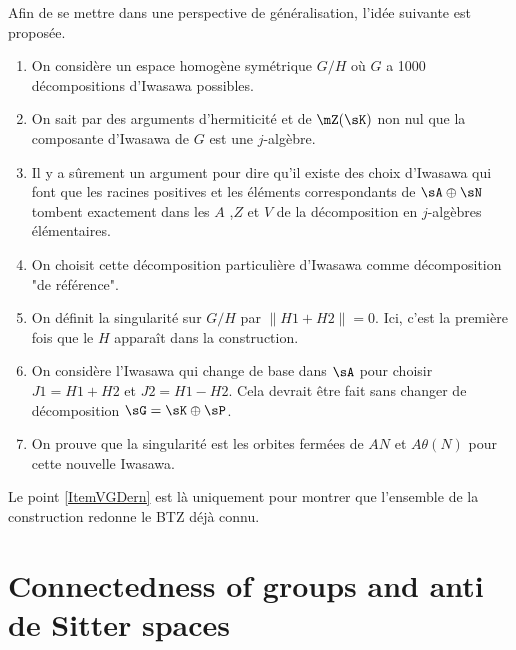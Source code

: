 Afin de se mettre dans une perspective de généralisation, l'idée suivante est proposée.

\begin{enumerate}

	\item
		


On considère un espace homogène symétrique $G/H$ où $G$ a 1000 décompositions d'Iwasawa possibles.

\item
 On sait par des arguments d'hermiticité et de $\mZ(\sK)$ non nul que la composante d'Iwasawa de $G$ est une $j$-algèbre.

\item
Il y a sûrement un argument pour dire qu'il existe des choix d'Iwasawa qui font que les racines positives et les éléments correspondants de $\sA\oplus\sN$ tombent exactement dans les $A$ ,$Z$ et $V $ de la décomposition en $j$-algèbres élémentaires.

\item
On choisit cette décomposition particulière d'Iwasawa comme décomposition "de référence".

\item
 On définit la singularité sur $G/H$ par $\| H1+H2\|=0$. Ici, c'est la première fois que le $H$ apparaît dans la construction.

 \item
 On considère l'Iwasawa qui change de base dans $\sA$ pour choisir $J1=H1+H2$ et $J2=H1-H2$. Cela devrait être fait sans changer de décomposition $\sG=\sK\oplus\sP$.

\item		\label{ItemVGDern}
 On prouve que la singularité est les orbites fermées de $AN$ et $A\theta(N)$ pour cette nouvelle Iwasawa.
\end{enumerate}


Le point \ref{ItemVGDern} est là uniquement pour montrer que l'ensemble de la construction redonne le BTZ déjà connu.

\section{Connectedness of groups and anti de Sitter spaces}

